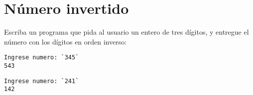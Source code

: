 \section{Número invertido}

Escriba un programa que pida al usuario un entero de tres dígitos, y
entregue el número con los dígitos en orden inverso:

\begin{lstlisting}[language=testcase]
Ingrese numero: `345`
543
\end{lstlisting}

\begin{lstlisting}[language=testcase]
Ingrese numero: `241`
142
\end{lstlisting}

